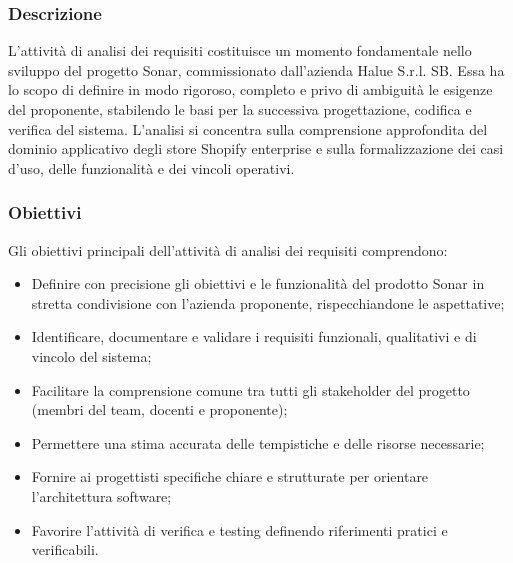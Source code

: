 \subsubsection{Descrizione}
L'attività di analisi dei requisiti costituisce un momento fondamentale nello sviluppo del progetto Sonar, commissionato dall'azienda Halue S.r.l. SB. Essa ha lo scopo di definire in modo rigoroso, completo e privo di ambiguità le esigenze del proponente, stabilendo le basi per la successiva progettazione, codifica e verifica del sistema. L'analisi si concentra sulla comprensione approfondita del dominio applicativo degli store Shopify enterprise e sulla formalizzazione dei casi d'uso, delle funzionalità e dei vincoli operativi.

\subsubsection{Obiettivi}
Gli obiettivi principali dell'attività di analisi dei requisiti comprendono:
\begin{itemize}
    \item Definire con precisione gli obiettivi e le funzionalità del prodotto Sonar in stretta condivisione con l'azienda proponente, rispecchiandone le aspettative;
    \item Identificare, documentare e validare i requisiti funzionali, qualitativi e di vincolo del sistema;
    \item Facilitare la comprensione comune tra tutti gli stakeholder del progetto (membri del team, docenti e proponente);
    \item Permettere una stima accurata delle tempistiche e delle risorse necessarie;
    \item Fornire ai progettisti specifiche chiare e strutturate per orientare l'architettura software;
    \item Favorire l'attività di verifica e testing definendo riferimenti pratici e verificabili.
\end{itemize}

